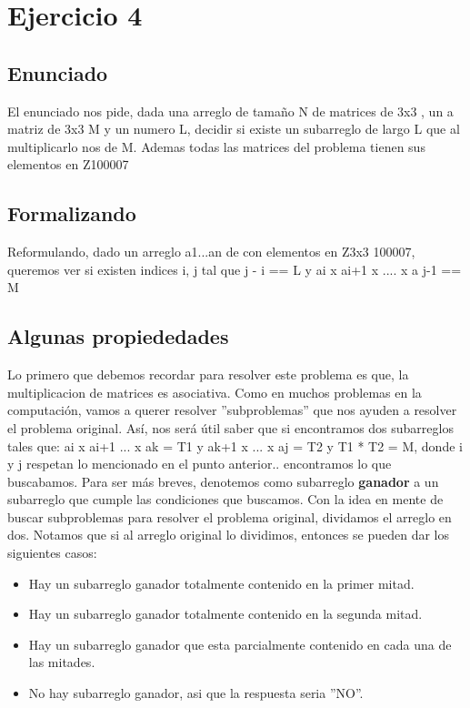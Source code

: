 \section{Ejercicio 4}

\subsection{Enunciado}
El enunciado nos pide, dada una arreglo de tamaño N de matrices de 3x3 , un a matriz de 3x3 M y un numero L, decidir
si existe un subarreglo de largo L que al multiplicarlo nos de M.
Ademas todas las matrices del problema tienen sus elementos en Z100007

\subsection{Formalizando}
Reformulando, dado un arreglo a1...an de con elementos en Z3x3 100007, queremos ver si existen indices
i, j tal que j - i == L y ai x ai+1 x .... x a j-1 == M

\subsection{Algunas propiededades}
Lo primero que debemos recordar para resolver este problema es que, la multiplicacion de matrices es asociativa.
Como en muchos problemas en la computación, vamos a querer resolver ''subproblemas''
que nos ayuden a resolver el problema original. Así, nos será útil saber que si encontramos dos subarreglos tales que:
ai x ai+1 ... x ak = T1 y ak+1 x ... x aj = T2 y T1 * T2 = M, donde i y j
respetan lo mencionado en el punto anterior..
encontramos lo que buscabamos.
\newline
Para ser más breves, denotemos como subarreglo \textbf{ganador} a un subarreglo que cumple las condiciones que buscamos.
Con la idea en mente de buscar subproblemas para resolver el problema original, dividamos el arreglo en dos.
Notamos que si al arreglo original lo dividimos, entonces se pueden dar los siguientes casos:
\begin{itemize}
\item Hay un subarreglo ganador totalmente contenido en la primer mitad.
\item Hay un subarreglo ganador totalmente contenido en la segunda mitad.
\item Hay un subarreglo ganador que esta parcialmente contenido en cada una de las mitades.
\item No hay subarreglo ganador, asi que la respuesta seria ''NO''.
\end{itemize}

